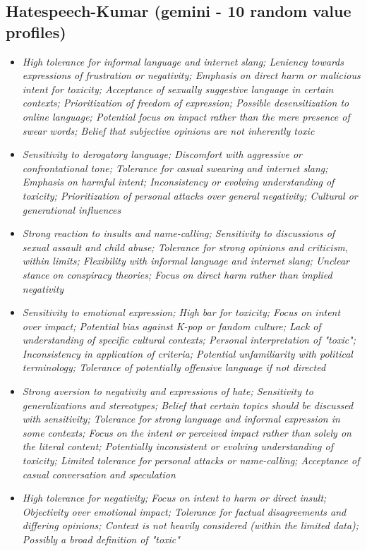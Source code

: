 \documentclass[11pt]{article}
\newcommand{\profiletext}[1]{\textit{#1}}
\begin{document}
\subsection{Hatespeech-Kumar (gemini - 10 random value profiles)}
\begin{itemize}
\item \profiletext{High tolerance for informal language and internet slang; Leniency towards expressions of frustration or negativity; Emphasis on direct harm or malicious intent for toxicity; Acceptance of sexually suggestive language in certain contexts; Prioritization of freedom of expression; Possible desensitization to online language; Potential focus on impact rather than the mere presence of swear words; Belief that subjective opinions are not inherently toxic}
\item \profiletext{Sensitivity to derogatory language; Discomfort with aggressive or confrontational tone; Tolerance for casual swearing and internet slang; Emphasis on harmful intent; Inconsistency or evolving understanding of toxicity; Prioritization of personal attacks over general negativity; Cultural or generational influences}
\item \profiletext{Strong reaction to insults and name-calling; Sensitivity to discussions of sexual assault and child abuse; Tolerance for strong opinions and criticism, within limits; Flexibility with informal language and internet slang; Unclear stance on conspiracy theories; Focus on direct harm rather than implied negativity}
\item \profiletext{Sensitivity to emotional expression; High bar for toxicity; Focus on intent over impact; Potential bias against K-pop or fandom culture; Lack of understanding of specific cultural contexts; Personal interpretation of "toxic"; Inconsistency in application of criteria; Potential unfamiliarity with political terminology; Tolerance of potentially offensive language if not directed}
\item \profiletext{Strong aversion to negativity and expressions of hate; Sensitivity to generalizations and stereotypes; Belief that certain topics should be discussed with sensitivity; Tolerance for strong language and informal expression in some contexts; Focus on the intent or perceived impact rather than solely on the literal content; Potentially inconsistent or evolving understanding of toxicity; Limited tolerance for personal attacks or name-calling; Acceptance of casual conversation and speculation}
\item \profiletext{High tolerance for negativity; Focus on intent to harm or direct insult; Objectivity over emotional impact; Tolerance for factual disagreements and differing opinions; Context is not heavily considered (within the limited data); Possibly a broad definition of "toxic"}

\end{itemize}
\end{document}
